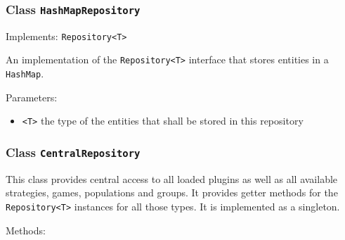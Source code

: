 \documentclass[parskip=full,11pt]{scrartcl}
\begin{document}
\subsubsection{Class \texttt{HashMapRepository}}

Implements: \texttt{Repository<T>}

An implementation of the \texttt{Repository<T>} interface that stores entities in a \texttt{HashMap}.

Parameters:

\begin{itemize}\itemsep -10pt
	\item \texttt{<T>} the type of the entities that shall be stored in this repository
\end{itemize}

\subsubsection{Class \texttt{CentralRepository}}

This class provides central access to all loaded plugins as well as all available strategies, games, populations and groups. It provides getter methods for the \texttt{Repository<T>} instances for all those types. It is implemented as a singleton.

Methods:
\end{document}
